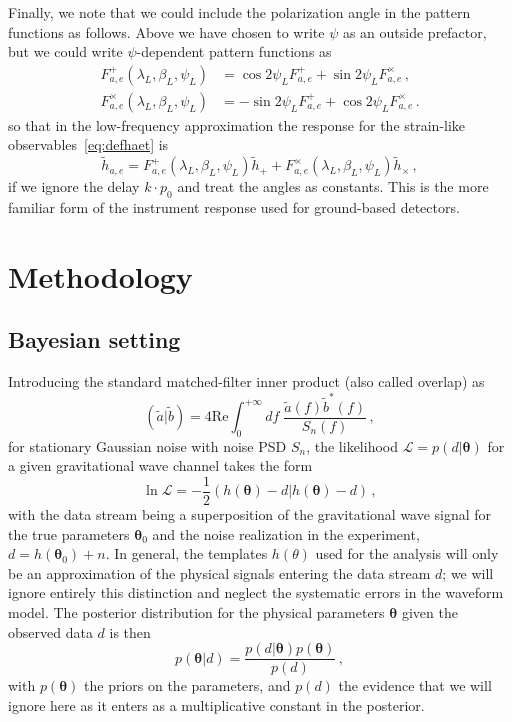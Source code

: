 \documentclass[aps,showpacs,twocolumn,prd,superscriptaddress,nofootinbib]{revtex4-1}
\newcommand{\be}{\begin{equation}}
\newcommand{\ee}{\end{equation}}
\newcommand{\bsub}{\begin{subequations}}
\newcommand{\esub}{\end{subequations}}
\newcommand\calL{{\mathcal{L}}}
\newcommand\betaL{{\beta_{L}}}
\newcommand\lambdaL{{\lambda_{L}}}
\newcommand\psiL{{\psi_{L}}}
\begin{document}
Finally, we note that we could include the polarization angle in the pattern functions as follows. Above we have chosen to write $\psi$ as an outside prefactor, but we could write $\psi$-dependent pattern functions as
\bsub
\begin{align}
	F^{+}_{a,e}(\lambdaL, \betaL, \psiL) &= \cos 2\psiL F^{+}_{a,e} + \sin 2\psiL F^{\times}_{a,e} \,,\\
	F^{\times}_{a,e}(\lambdaL, \betaL, \psiL) &= -\sin 2\psiL F^{+}_{a,e} + \cos 2\psiL F^{\times}_{a,e} \,.
\end{align}
\esub
so that in the low-frequency approximation the response for the strain-like observables~\eqref{eq:defhaet} is
\be
	\tilde{h}_{a,e} = F^{+}_{a,e}(\lambdaL, \betaL, \psiL) \tilde{h}_{+} + F^{\times}_{a,e}(\lambdaL, \betaL, \psiL) \tilde{h}_{\times} \,,
\ee
if we ignore the delay $k \cdot p_{0}$ and treat the angles as constants. This is the more familiar form of the instrument response used for ground-based detectors.



\section{Methodology}
\label{sec:method}


\subsection{Bayesian setting}
\label{subsec:bayes}

Introducing the standard matched-filter inner product (also called overlap) as
\be\label{eq:definnerproduct}
	( \tilde{a} | \tilde{b} ) = 4 \mathrm{Re} \int_{0}^{+\infty} df \; \frac{\tilde{a}(f) \tilde{b}^{*}(f)}{S_{n}(f)} \,,
\ee
for stationary Gaussian noise with noise PSD $S_{n}$, the likelihood $\calL = p(d | \bm{\theta})$ for a given gravitational wave channel takes the form
\be\label{eq:deflnL}
	\ln \calL = -\frac{1}{2} \left( h(\bm{\theta}) - d | h(\bm{\theta}) - d \right) \,,
\ee
with the data stream being a superposition of the gravitational wave signal for the true parameters $\bm{\theta}_{0}$ and the noise realization in the experiment, $d = h(\bm{\theta}_{0}) + n$. In general, the templates $h(\theta)$ used for the analysis will only be an approximation of the physical signals entering the data stream $d$; we will ignore entirely this distinction and neglect the systematic errors in the waveform model. The posterior distribution for the physical parameters $\bm{\theta}$ given the observed data $d$ is then
\be\label{eq:defBayes}
	p\left( \bm{\theta} | d \right) = \frac{p(d | \bm{\theta})p(\bm{\theta})}{p(d)}\,,
\ee
with $p(\bm{\theta})$ the priors on the parameters, and $p(d)$ the evidence that we will ignore here as it enters as a multiplicative constant in the posterior.
\end{document}
